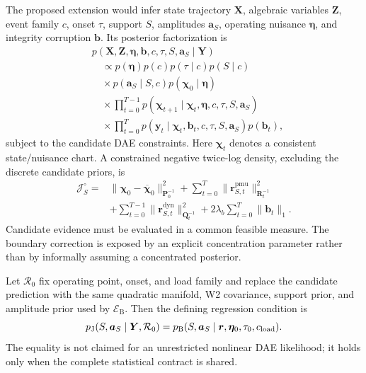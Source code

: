 The proposed extension would infer state trajectory $\bm X$, algebraic variables $\bm Z$, event family $c$, onset $\tau$, support $S$, amplitudes $\bm a_S$, operating nuisance $\bm\eta$, and integrity corruption $\bm b$. Its posterior factorization is
\begin{align}
 &p(\bm X,\bm Z,\bm\eta,\bm b,c,\tau,S,\bm a_S\mid\bm Y)
 \nonumber\\[-2pt]
 &\quad\propto p(\bm\eta)p(c)p(\tau\mid c)p(S\mid c)\nonumber\\
 &\quad\times p(\bm a_S\mid S,c)p(\bm\chi_0\mid\bm\eta)\nonumber\\
 &\quad\times\prod_{t=0}^{T-1}
 p(\bm\chi_{t+1}\mid\bm\chi_t,\bm\eta,c,\tau,S,\bm a_S)\nonumber\\
 &\quad\times\prod_{t=0}^{T}
 p(\bm y_t\mid\bm\chi_t,\bm b_t,c,\tau,S,\bm a_S)p(\bm b_t),
 \label{eq:supp-full-joint-posterior}
\end{align}
subject to the candidate DAE constraints. Here $\bm\chi_t$ denotes a consistent state/nuisance chart. A constrained negative twice-log density, excluding the discrete candidate priors, is
\begin{equation}
 \begin{aligned}
 \mathcal J_S^{\circ}={}&
 \|\bm\chi_0-\overline{\bm\chi}_0\|_{\bm P_0^{-1}}^2
 +\sum_{t=0}^{T}\|\bm r_{S,t}^{\mathrm{pmu}}\|_{\bm R_t^{-1}}^2\\
 &+\sum_{t=0}^{T-1}
 \|\bm r_{S,t}^{\mathrm{dyn}}\|_{\bm Q_t^{-1}}^2
 +2\lambda_b\sum_{t=0}^{T}\|\bm b_t\|_1.
 \end{aligned}
 \label{eq:supp-joint-objective}
\end{equation}
Candidate evidence must be evaluated in a common feasible measure. The boundary
correction is exposed by an explicit concentration parameter rather than by
informally assuming a concentrated posterior.

Let $\mathcal R_0$ fix operating point, onset, and load family and replace the
candidate prediction with the same quadratic manifold, W2 covariance, support
prior, and amplitude prior used by $\mathcal E_{\mathrm B}$. Then the defining
regression condition is
\begin{equation}
 p_{\mathrm J}(S,\bm a_S\mid\bm Y,\mathcal R_0)
 =p_{\mathrm B}(S,\bm a_S\mid\bm r,\bm\eta_0,\tau_0,c_{\rm load}).
 \label{eq:supp-joint-batch-reduction}
\end{equation}
The equality is not claimed for an unrestricted nonlinear DAE likelihood; it
holds only when the complete statistical contract is shared.

